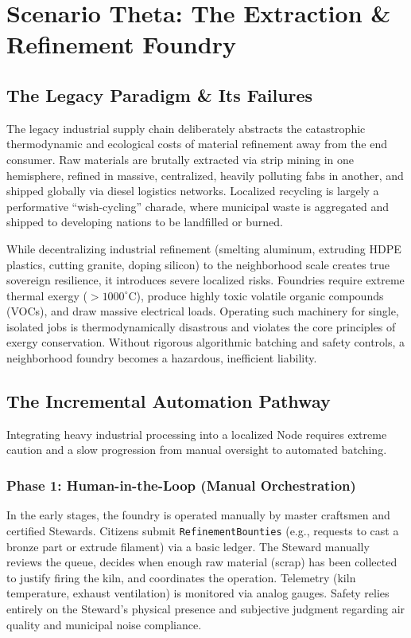 \chapter{Scenario Theta: The Extraction \& Refinement Foundry}
\label{ch:theta}

\section{The Legacy Paradigm \& Its Failures}
The legacy industrial supply chain deliberately abstracts the catastrophic thermodynamic and ecological costs of material refinement away from the end consumer. Raw materials are brutally extracted via strip mining in one hemisphere, refined in massive, centralized, heavily polluting fabs in another, and shipped globally via diesel logistics networks. Localized recycling is largely a performative ``wish-cycling'' charade, where municipal waste is aggregated and shipped to developing nations to be landfilled or burned.

While decentralizing industrial refinement (smelting aluminum, extruding HDPE plastics, cutting granite, doping silicon) to the neighborhood scale creates true sovereign resilience, it introduces severe localized risks. Foundries require extreme thermal exergy ($>1000^\circ\text{C}$), produce highly toxic volatile organic compounds (VOCs), and draw massive electrical loads. Operating such machinery for single, isolated jobs is thermodynamically disastrous and violates the core principles of exergy conservation. Without rigorous algorithmic batching and safety controls, a neighborhood foundry becomes a hazardous, inefficient liability.

\section{The Incremental Automation Pathway}
Integrating heavy industrial processing into a localized Node requires extreme caution and a slow progression from manual oversight to automated batching.

\subsection{Phase 1: Human-in-the-Loop (Manual Orchestration)}
In the early stages, the foundry is operated manually by master craftsmen and certified Stewards. Citizens submit \texttt{RefinementBounties} (e.g., requests to cast a bronze part or extrude filament) via a basic ledger. The Steward manually reviews the queue, decides when enough raw material (scrap) has been collected to justify firing the kiln, and coordinates the operation. Telemetry (kiln temperature, exhaust ventilation) is monitored via analog gauges. Safety relies entirely on the Steward's physical presence and subjective judgment regarding air quality and municipal noise compliance.

